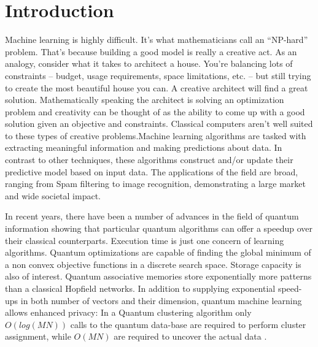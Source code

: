 \chapter{Introduction}\label{ch:introduction}

Machine learning is highly difficult. It’s what mathematicians call an “NP-hard” problem. That’s because building a good model is really a creative act. As an analogy, consider what it takes to architect a house. You’re balancing lots of constraints -- budget, usage requirements, space limitations, etc. -- but still trying to create the most beautiful house you can. A creative architect will find a great solution. Mathematically speaking the architect is solving an optimization problem and creativity can be thought of as the ability to come up with a good solution given an objective and constraints. Classical computers aren’t well suited to these types of creative problems.Machine learning algorithms are tasked with extracting meaningful information and making predictions about data. In contrast to other techniques, these algorithms construct and/or update their predictive model based on input data. The applications of the field are broad, ranging from Spam filtering to image recognition, demonstrating a large market and wide societal impact.\par\bigskip
In recent years, there have been a number of advances in the field of quantum information showing that particular quantum algorithms can offer a speedup over their classical counterparts. Execution time is just one concern of learning algorithms. Quantum optimizations are capable of finding the global minimum of a non convex objective functions in a discrete search space. Storage capacity is also of interest. Quantum associative memories store exponentially more patterns than a classical Hopfield networks. In addition to supplying exponential speed-ups in both number of vectors and their dimension, quantum machine learning allows enhanced privacy: In a Quantum clustering algorithm only $O(log(MN))$ calls to the quantum data-base are required to perform cluster assignment, while $O(MN)$ are required to uncover the actual data \cite{kmeans}.\par\bigskip
